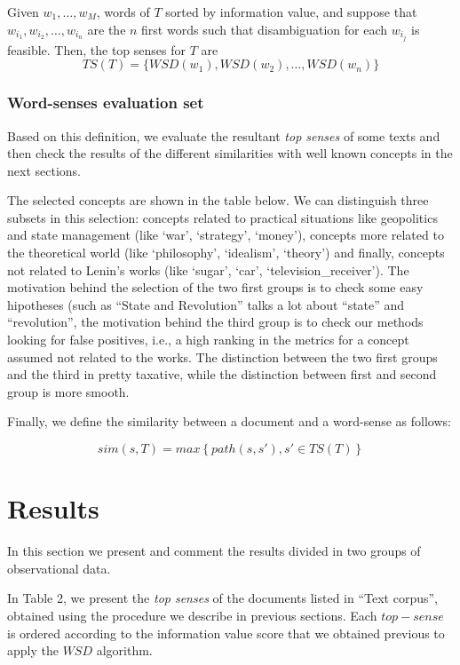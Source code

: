 \documentclass{pnastwo}
\begin{document}
\begin{article}
Given $w_1, \ldots, w_M$, words of $T$ sorted by information value, and suppose that $w_{i_1}, w_{i_2}, \ldots, w_{i_n}$ are the $n$ first words  such that disambiguation for each $w_{i_j}$ is feasible. Then, the top senses for $T$ are
\begin{equation}
  TS(T) = \{ WSD(w_1), WSD(w_2), \ldots, WSD(w_n) \}
\end{equation}

\subsubsection{Word-senses evaluation set}


Based on this definition, we evaluate the resultant \textit{top senses} of some texts and then check the results of the different similarities with well known concepts in the next sections.

The selected concepts are shown in the table below. We can distinguish three subsets in this selection: concepts related to practical situations like geopolitics and state management (like `war', `strategy', `money'), concepts more related to the theoretical world (like  `philosophy', `idealism', `theory') and finally, concepts not related to Lenin's works (like `sugar', `car', `television\_receiver'). The motivation behind the selection of the two first groups is to check some easy hipotheses (such as ``State and Revolution'' talks a lot about ``state'' and ``revolution'', the motivation behind the third group is to check our methods looking for false positives, i.e., a high ranking in the metrics for a concept assumed not related to the works. The distinction between the two first groups and the third in pretty taxative, while the distinction between first and second group is more smooth.

Finally, we define the similarity between a document and a word-sense as follows:

\begin{equation}
\label{eq:sim}
  sim(s, T) = max \left\{ path(s,s'), s' \in TS(T) \right\}
\end{equation}




\section{Results}
In this section we present and comment the results divided in two groups of observational data. 

In Table 2, we present the \textit{top senses} of the documents listed in ``Text corpus'', obtained using the procedure we describe in previous sections. Each $top-sense$ is ordered according to the information value score that we obtained previous to apply the $WSD$ algorithm. 


\end{article}
\end{document}

